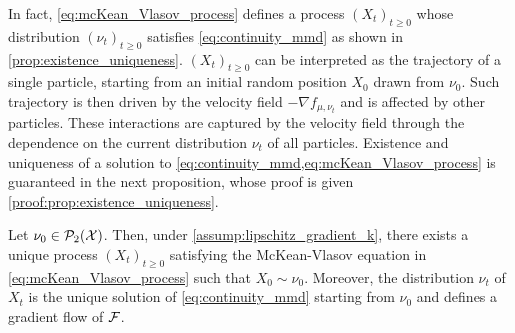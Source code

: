 In fact,  \cref{eq:mcKean_Vlasov_process} defines a process $(X_t)_{t\geq 0}$ whose distribution $(\nu_t)_{t\geq 0}$ satisfies \cref{eq:continuity_mmd} as shown in \cref{prop:existence_uniqueness}. 
$(X_t)_{t\geq 0}$ can be interpreted as the trajectory of a single particle, starting from an initial random position $X_0$ drawn from $\nu_0$. Such trajectory is then driven by the velocity field $-\nabla f_{\mu,\nu_t}$ and is affected by other particles. These interactions are captured by the velocity field through the dependence on the current distribution $\nu_t$ of all particles.
Existence and uniqueness of a solution to \cref{eq:continuity_mmd,eq:mcKean_Vlasov_process} is guaranteed in the next proposition, whose proof is given \cref{proof:prop:existence_uniqueness}.
\begin{proposition}\label{prop:existence_uniqueness}
	Let $\nu_0\in \mathcal{P}_2({{\mathcal X}})$. %
	Then, under \cref{assump:lipschitz_gradient_k}, there exists a unique process $(X_t)_{t\geq 0}$  satisfying the McKean-Vlasov equation in \cref{eq:mcKean_Vlasov_process} such that $X_0 \sim \nu_0$. Moreover, the distribution $\nu_t$ of $X_t$ is the unique solution of \cref{eq:continuity_mmd} starting from $\nu_0$ and defines a gradient flow of ${{\mathcal F}}$. 
\end{proposition}
